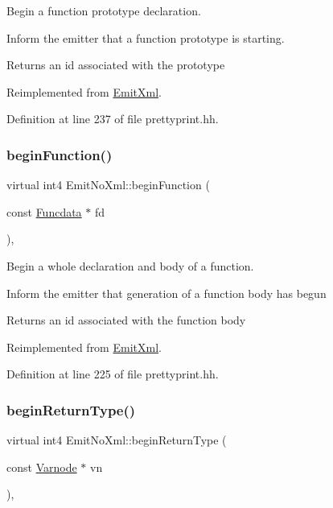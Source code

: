 Begin a function prototype declaration. 

Inform the emitter that a function prototype is starting. \begin{DoxyReturn}{Returns}
an id associated with the prototype 
\end{DoxyReturn}


Reimplemented from \mbox{\hyperlink{class_emit_xml_acaf7a29dd1eb427f20e99dccf3581f59}{Emit\+Xml}}.



Definition at line 237 of file prettyprint.\+hh.

\mbox{\label{class_emit_no_xml_ad06515c4f61b81ee45404871780e17a0}} 
\subsubsection{\texorpdfstring{beginFunction()}{beginFunction()}}
{\footnotesize\ttfamily virtual int4 Emit\+No\+Xml\+::begin\+Function (\begin{DoxyParamCaption}\item[{const \mbox{\hyperlink{class_funcdata}{Funcdata}} $\ast$}]{fd }\end{DoxyParamCaption})\hspace{0.3cm}{\ttfamily [inline]}, {\ttfamily [virtual]}}



Begin a whole declaration and body of a function. 

Inform the emitter that generation of a function body has begun \begin{DoxyReturn}{Returns}
an id associated with the function body 
\end{DoxyReturn}


Reimplemented from \mbox{\hyperlink{class_emit_xml_acff5f33b9ab6a4a036688160c98c0aa9}{Emit\+Xml}}.



Definition at line 225 of file prettyprint.\+hh.

\mbox{\label{class_emit_no_xml_a6f9c0d9a1be5e530a503fbc1e7b79687}} 
\subsubsection{\texorpdfstring{beginReturnType()}{beginReturnType()}}
{\footnotesize\ttfamily virtual int4 Emit\+No\+Xml\+::begin\+Return\+Type (\begin{DoxyParamCaption}\item[{const \mbox{\hyperlink{class_varnode}{Varnode}} $\ast$}]{vn }\end{DoxyParamCaption})\hspace{0.3cm}{\ttfamily [inline]}, {\ttfamily [virtual]}}




